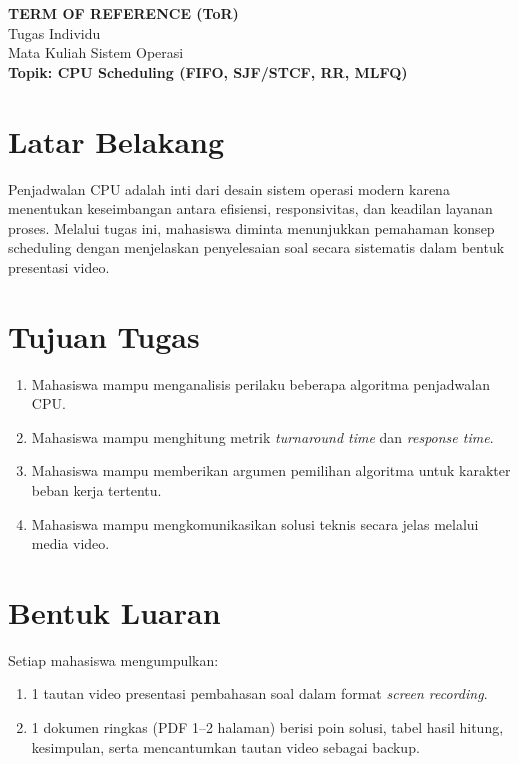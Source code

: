 \documentclass[12pt,a4paper]{article}
\begin{document}
\begin{center}
{\Large \textbf{TERM OF REFERENCE (ToR)}}\\[4pt]
{\large Tugas Individu}\\[2pt]
{\large Mata Kuliah Sistem Operasi}\\[6pt]
\textbf{Topik: CPU Scheduling (FIFO, SJF/STCF, RR, MLFQ)}
\end{center}

\vspace{0.6em}

\section{Latar Belakang}
Penjadwalan CPU adalah inti dari desain sistem operasi modern karena menentukan keseimbangan antara efisiensi, responsivitas, dan keadilan layanan proses. Melalui tugas ini, mahasiswa diminta menunjukkan pemahaman konsep scheduling dengan menjelaskan penyelesaian soal secara sistematis dalam bentuk presentasi video.

\section{Tujuan Tugas}
\begin{enumerate}
    \item Mahasiswa mampu menganalisis perilaku beberapa algoritma penjadwalan CPU.
    \item Mahasiswa mampu menghitung metrik \textit{turnaround time} dan \textit{response time}.
    \item Mahasiswa mampu memberikan argumen pemilihan algoritma untuk karakter beban kerja tertentu.
    \item Mahasiswa mampu mengkomunikasikan solusi teknis secara jelas melalui media video.
\end{enumerate}

\section{Bentuk Luaran}
Setiap mahasiswa mengumpulkan:
\begin{enumerate}
    \item 1 tautan video presentasi pembahasan soal dalam format \textit{screen recording}.
    \item 1 dokumen ringkas (PDF 1--2 halaman) berisi poin solusi, tabel hasil hitung, kesimpulan, serta mencantumkan tautan video sebagai backup.
\end{enumerate}
\end{document}
